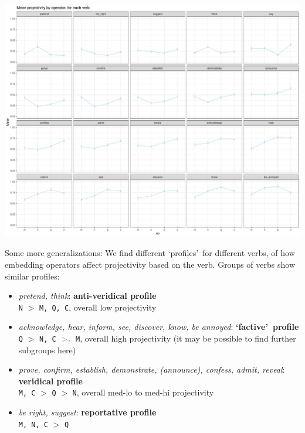 \documentclass[10pt]{article}\usepackage[]{graphicx}\usepackage[]{color}
\newenvironment{knitrout}{}{} %
\begin{document}
\begin{knitrout}
\color{fgcolor}

{\centering \includegraphics[width=\linewidth]{figures/figuresverb-profiles-1} 

}


\end{knitrout}
Some more generalizations: We find different \lq profiles\rq\ for different verbs, of how embedding operators affect projectivity based on the verb. Groups of verbs show similar profiles:

\begin{itemize}
  \item \emph{pretend, think}: \textbf{anti-veridical profile}\\
    \texttt{N} $>$ \texttt{M, Q, C}, overall low projectivity

  \item \emph{acknowledge, hear, inform, see, discover, know, be annoyed}: \textbf{\lq factive\rq\ profile}\\
    \texttt{Q} $>$ \texttt{N, C} \textcolor{gray}{$>_?$} \texttt{M}, overall high projectivity (it may be possible to find further subgroups here)

  \item \emph{prove, confirm, establish, demonstrate, (announce), confess, admit, reveal}: \textbf{veridical profile}\\
    \texttt{M, C} $>$ \texttt{Q} $>$ \texttt{N}, overall med-lo to med-hi projectivity
  
  \item \emph{be right, suggest}: \textbf{reportative profile}\\
    \texttt{M, N, C} $>$ \texttt{Q}

\end{itemize}
\end{document}
